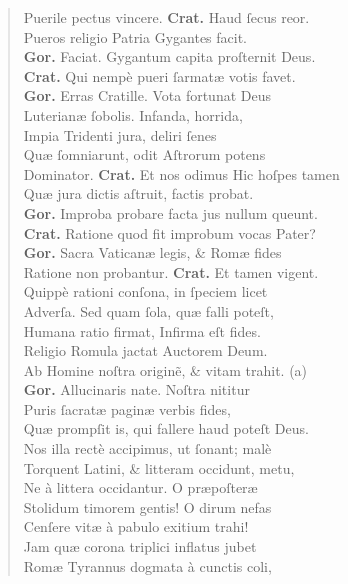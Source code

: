 \documentclass[a4paper,12pt]{article}
\begin{document}
\begin{verse}
Puerile pectus vincere. \textbf{Crat.} Haud ſecus reor.\\[0pt]
Pueros religio Patria Gygantes facit.\\[0pt]
\textbf{Gor.} Faciat. Gygantum capita proſternit Deus.\\[0pt]
\textbf{Crat.} Qui nempè pueri ſarmatæ votis favet.\\[0pt]
\textbf{Gor.} Erras Cratille. Vota fortunat Deus\\[0pt]
Luterianæ ſobolis. Infanda, horrida,\\[0pt]
Impia Tridenti jura, deliri ſenes\\[0pt]
Quæ ſomniarunt, odit Aſtrorum potens\\[0pt]
Dominator. \textbf{Crat.} Et nos odimus Hic hoſpes tamen\\[0pt]
Quæ jura dictis aſtruit, factis probat.\\[0pt]
\textbf{Gor.} Improba probare facta jus nullum queunt.\\[0pt]
\textbf{Crat.} Ratione quod fit improbum vocas Pater?\\[0pt]
\textbf{Gor.} Sacra Vaticanæ legis, \& Romæ fides\\[0pt]
Ratione non probantur. \textbf{Crat.} Et tamen vigent.\\[0pt]
Quippè rationi conſona, in ſpeciem licet\\[0pt]
Adverſa. Sed quam ſola, quæ falli poteſt,\\[0pt]
Humana ratio firmat, Infirma eſt fides.\\[0pt]
Religio Romula jactat Auctorem Deum.\\[0pt]
Ab Homine noſtra originẽ, \& vitam trahit. (a)\footnotemark\\[0pt]
\textbf{Gor.} Allucinaris nate. Noſtra nititur\\[0pt]
Puris ſacratæ paginæ verbis fides,\\[0pt]
Quæ prompſit is, qui fallere haud poteſt Deus.\\[0pt]
Nos illa rectè accipimus, ut ſonant; malè\\[0pt]
Torquent Latini, \& litteram occidunt, metu,\\[0pt]
Ne à littera occidantur. O præpoſteræ\\[0pt]
Stolidum timorem gentis! O dirum nefas\\[0pt]
Cenſere vitæ à pabulo exitium trahi!\\[0pt]
Jam quæ corona triplici inflatus jubet\\[0pt]
Romæ Tyrannus dogmata à cunctis coli,\\[0pt]

\end{verse}
\end{document}
